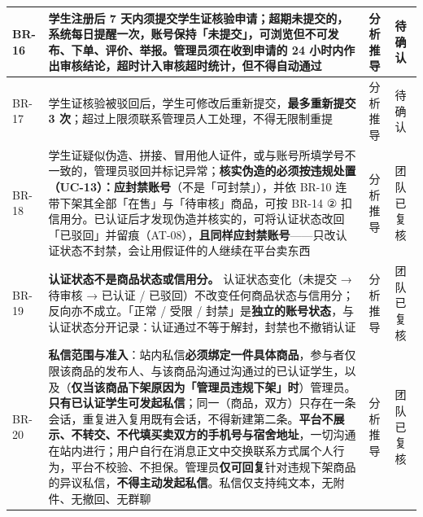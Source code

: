 \documentclass[12pt,a4paper]{ctexart}
\begin{document}
{\begin{longtable}{|p{1.32cm}|p{12.03cm}|p{1.32cm}|p{1.32cm}|}
\hline
BR-16 & 学生注册后 \textbf{7 天内}须提交学生证核验申请；超期未提交的，系统每日提醒一次，账号保持「未提交」，可浏览但不可发布、下单、评价、举报。管理员须在收到申请的 \textbf{24 小时内}作出审核结论，超时计入审核超时统计，但\textbf{不得自动通过} & 分析推导 & 待确认 \\
\hline
BR-17 & 学生证核验被驳回后，学生可修改后重新提交，\textbf{最多重新提交 3 次}；超过上限须联系管理员人工处理，不得无限制重提 & 分析推导 & 待确认 \\
\hline
BR-18 & 学生证疑似伪造、拼接、冒用他人证件，或与账号所填学号不一致的，管理员驳回并标记异常；\textbf{核实伪造的必须按违规处置（UC-13）：应封禁账号}（不是「可封禁」），并依 BR-10 连带下架其全部「在售」与「待审核」商品，可按 BR-14 ② 扣信用分。已认证后才发现伪造并核实的，可将认证状态改回「已驳回」并留痕（AT-08），\textbf{且同样应封禁账号}——只改认证状态不封禁，会让用假证件的人继续在平台卖东西 & 分析推导 & 团队已复核 \\
\hline
BR-19 & \textbf{认证状态不是商品状态或信用分。} 认证状态变化（未提交 → 待审核 → 已认证 / 已驳回）不改变任何商品状态与信用分；反向亦不成立。「正常 / 受限 / 封禁」是\textbf{独立的账号状态}，与认证状态分开记录：认证通过不等于解封，封禁也不撤销认证 & 分析推导 & 团队已复核 \\
\hline
BR-20 & \textbf{私信范围与准入}：站内私信\textbf{必须绑定一件具体商品}，参与者仅限该商品的发布人、与该商品沟通过沟通过的已认证学生，以及（\textbf{仅当该商品下架原因为「管理员违规下架」时}）管理员。\textbf{只有已认证学生可发起私信}；同一（商品，双方）只存在一条会话，重复进入复用既有会话，不得新建第二条。\textbf{平台不展示、不转交、不代填买卖双方的手机号与宿舍地址}，一切沟通在站内进行；用户自行在消息正文中交换联系方式属个人行为，平台不校验、不担保。管理员\textbf{仅可回复}针对违规下架商品的异议私信，\textbf{不得主动发起私信}。私信仅支持纯文本，无附件、无撤回、无群聊 & 分析推导 & 团队已复核 \\
\hline
\end{longtable}
}
\end{document}
